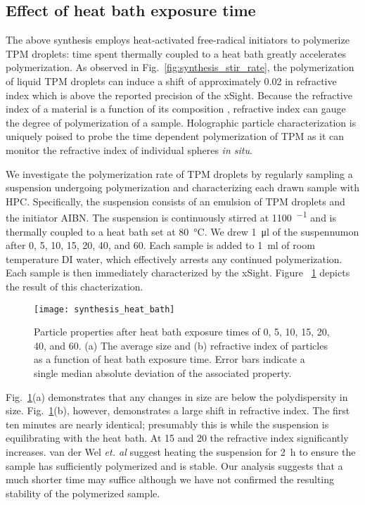 \subsection{Effect of heat bath exposure time}
The above synthesis employs heat-activated free-radical initiators to polymerize TPM droplets:
time spent thermally coupled to a heat bath greatly accelerates polymerization.
As observed in Fig.~\ref{fig:synthesis_stir_rate}, the polymerization of
liquid TPM droplets can induce a shift of approximately \SI{0.02}{} in refractive index
which is above the reported precision of the xSight.  Because the refractive index
of a material is a function of its composition \cite{wang15}, refractive index can gauge the degree of
polymerization of a sample.  Holographic particle
characterization is uniquely poised to probe the time dependent polymerization of TPM as
it can monitor the refractive index of individual spheres \emph{in situ}.

We investigate the polymerization rate of TPM droplets by regularly sampling a
suspension undergoing polymerization and characterizing each drawn sample with HPC.
Specifically, the suspension consists of an emulsion of TPM droplets
and the initiator AIBN. The suspension is continuously stirred at \SI{1100}{\min^{-1}}
and is thermally coupled to a heat bath set at \SI{80}{\degreeCelsius}.
We drew \SI{1}{\ul} of the suspennumon after \num{0}, \num{5}, \num{10}, \num{15},
\num{20}, \num{40}, and \SI{60}{\min}. Each sample is added to \SI{1}{\ml} of
room temperature DI water, which effectively arrests any continued polymerization.
Each sample is then immediately characterized by the xSight. Figure ~\ref{fig:heat_size_time}
depicts the result of this chacterization.


\begin{figure}
    \centering
    \texttt{[image: synthesis\_heat\_bath]}
    \caption{Particle properties after heat bath exposure times of \num{0}, \num{5},
      \num{10}, \num{15}, \num{20}, \num{40}, and \SI{60}{\min}.
      (a) The average size and (b) refractive index of particles as a function
      of heat bath exposure time. Error bars indicate a single median absolute deviation
      of the associated property.}
    \label{fig:heat_size_time}
\end{figure}

Fig.~\ref{fig:heat_size_time}(a) demonstrates that any changes in size are below
the polydispersity in size. Fig.~\ref{fig:heat_size_time}(b), however, demonstrates
a large shift in refractive index. The first ten minutes are nearly identical;
presumably this is while the suspension is equilibrating with the heat bath.
At \num{15} and \SI{20}{\min} the refractive index significantly increases.
van der Wel \emph{et. al} \cite{vanderwel17} suggest heating the suspension
for \SI{2}{\hour} to ensure the sample has sufficiently polymerized and is
stable. Our analysis suggests that a much shorter time may suffice although
we have not confirmed the resulting stability of the polymerized sample.



